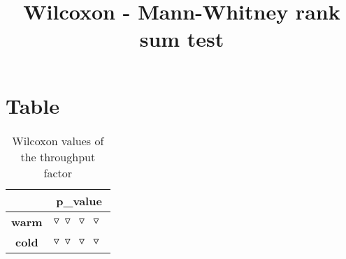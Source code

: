 \documentclass{article}
\title{Wilcoxon - Mann-Whitney rank sum test}
\author{}
\begin{document}
\maketitle
\section{Table}
\begin{table}[!htp]
  \caption{Wilcoxon values of the throughput factor}
  \label{table:throughput}
  \centering
  \begin{scriptsize}
  \begin{tabular}{c|c}
      & \textbf{p\_value} \\\hline
      \textbf{warm} & $\triangledown\ \triangledown\ \triangledown\ \triangledown\ $ \\
      \textbf{cold} & $\triangledown\ \triangledown\ \triangledown\ \triangledown\ $ \\
  \end{tabular}
  \end{scriptsize}
\end{table}
\end{document}

